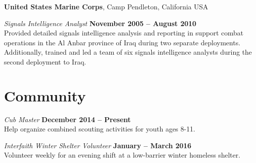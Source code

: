 \documentclass[margin,line]{res}
\begin{document}
\begin{resume}
{\bf United States Marine Corps}, Camp Pendleton, California USA

\vspace{-.3cm}
{\em Signals Intelligence Analyst} \hfill {\bf November 2005 -- August 2010}\\
Provided detailed signals intelligence analysis and reporting in
support combat operations in the Al Anbar province of Iraq during two
separate deployments. Additionally, trained and led a team of six
signals intelligence analysts during the second deployment to Iraq.

\section{\sc Community}

{\em Cub Master} \hfill {\bf December 2014 -- Present}\\
Help organize combined scouting activities for youth ages 8-11.

\vspace{-.3cm}
{\em Interfaith Winter Shelter Volunteer} \hfill {\bf January -- March 2016 }\\
Volunteer weekly for an evening shift at a low-barrier winter homeless
shelter.


\end{resume}
\end{document}
